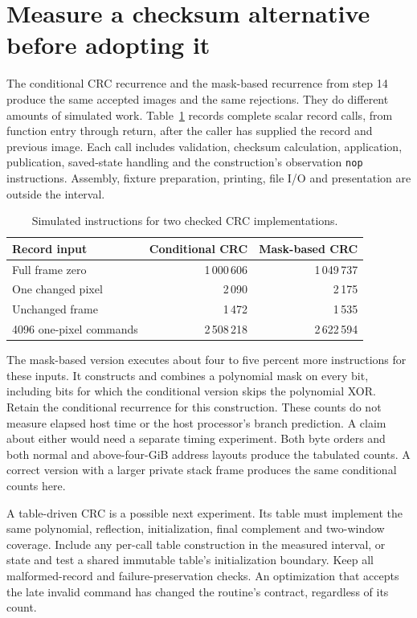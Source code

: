 \section{Measure a checksum alternative before adopting it}
The conditional CRC recurrence and the mask-based recurrence from step 14 produce
the same accepted images and the same rejections. They do different amounts of
simulated work. Table~\ref{tab:video-record-work} records complete scalar record
calls, from function entry through return, after the caller has supplied the
record and previous image. Each call includes validation, checksum calculation,
application, publication, saved-state handling and the construction's observation
\texttt{nop} instructions. Assembly, fixture preparation, printing, file I/O and
presentation are outside the interval.

\begin{table}[htbp]
\centering
\caption{Simulated instructions for two checked CRC implementations.}
\label{tab:video-record-work}
\begin{tabular}{lrr}
\toprule
Record input & Conditional CRC & Mask-based CRC \\
\midrule
Full frame zero & 1\,000\,606 & 1\,049\,737 \\
One changed pixel & 2\,090 & 2\,175 \\
Unchanged frame & 1\,472 & 1\,535 \\
4096 one-pixel commands & 2\,508\,218 & 2\,622\,594 \\
\bottomrule
\end{tabular}
\end{table}

The mask-based version executes about four to five percent more instructions for
these inputs. It constructs and combines a polynomial mask on every bit, including
bits for which the conditional version skips the polynomial XOR. Retain the
conditional recurrence for this construction. These counts do not measure elapsed
host time or the host processor's branch prediction. A claim about either would
need a separate timing experiment. Both byte orders and both normal and
above-four-GiB address layouts produce the tabulated counts. A correct version
with a larger private stack frame produces the same conditional counts here.

A table-driven CRC is a possible next experiment. Its table must implement the same
polynomial, reflection, initialization, final complement and two-window coverage.
Include any per-call table construction in the measured interval, or state and
test a shared immutable table's initialization boundary. Keep all malformed-record
and failure-preservation checks. An optimization that accepts the late invalid
command has changed the routine's contract, regardless of its count.
